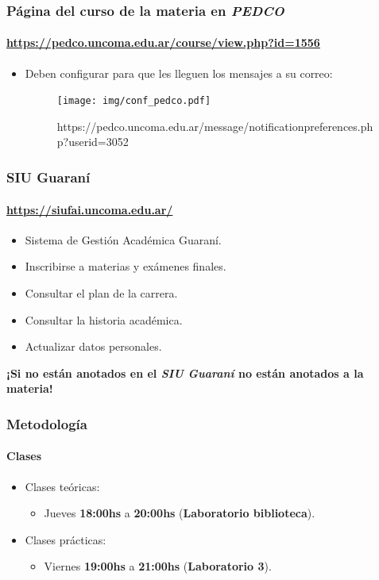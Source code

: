\documentclass[11pt,a4paper,spanish]{beamer}
\begin{document}
\begin{frame}

    \frametitle{Página del curso de la materia en \emph{PEDCO}}
    \framesubtitle{\url{https://pedco.uncoma.edu.ar/course/view.php?id=1556}}

\begin{itemize}
    \item Deben configurar para que les lleguen los mensajes a su correo:
    \begin{figure}
        \texttt{[image: img/conf\_pedco.pdf]}
        \captionsetup{textfont=tiny,labelformat=empty}
        \caption{\url{}https://pedco.uncoma.edu.ar/message/notificationpreferences.php?userid=3052}
    \end{figure}
\end{itemize}

\end{frame}

\begin{frame}

    \frametitle{SIU Guaraní}
    \framesubtitle{\url{https://siufai.uncoma.edu.ar/}}

\begin{itemize}
    \item Sistema de Gestión Académica Guaraní.
    \item Inscribirse a materias y exámenes finales.
    \item Consultar el plan de la carrera.
    \item Consultar la historia académica.
    \item Actualizar datos personales.
\end{itemize}

\textbf{¡Si no están anotados en el \emph{SIU Guaraní} no están anotados a la
    materia!}

\end{frame}

\begin{frame}

    \frametitle{Metodología}
    \framesubtitle{Clases}

\begin{itemize}
    \item Clases teóricas:
    \begin{itemize}
        \item Jueves \textbf{18:00hs} a \textbf{20:00hs} (\textbf{Laboratorio
            biblioteca}).
    \end{itemize}
    \item Clases prácticas:
    \begin{itemize}
        \item Viernes \textbf{19:00hs} a \textbf{21:00hs} (\textbf{Laboratorio
            3}).
    \end{itemize}

\end{itemize}

\end{frame}
\end{document}
